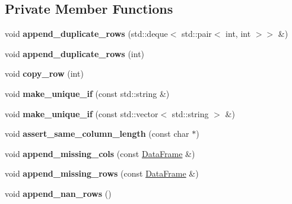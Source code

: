 \subsection*{Private Member Functions}
\begin{DoxyCompactItemize}
\item 
\mbox{\label{classDataFrame_a7c3a5ee79678ae22cdfaf51d6a02e536}} 
void {\bfseries append\+\_\+duplicate\+\_\+rows} (std\+::deque$<$ std\+::pair$<$ int, int $>$$>$ \&)
\item 
\mbox{\label{classDataFrame_aee52488afb8455d8b49786a3b8629249}} 
void {\bfseries append\+\_\+duplicate\+\_\+rows} (int)
\item 
\mbox{\label{classDataFrame_ad44e1c50bc67dc453a02bbcdf7b13a98}} 
void {\bfseries copy\+\_\+row} (int)
\item 
\mbox{\label{classDataFrame_a8454f81fa6854f280c48672214224160}} 
void {\bfseries make\+\_\+unique\+\_\+if} (const std\+::string \&)
\item 
\mbox{\label{classDataFrame_a2bb66e58b8b8153d4ae7c5e640f0fab4}} 
void {\bfseries make\+\_\+unique\+\_\+if} (const std\+::vector$<$ std\+::string $>$ \&)
\item 
\mbox{\label{classDataFrame_ae996ebef2abb39f125adc2cdff8846aa}} 
void {\bfseries assert\+\_\+same\+\_\+column\+\_\+length} (const char $\ast$)
\item 
\mbox{\label{classDataFrame_a56acb2da2d421ca0d28324a069593e23}} 
void {\bfseries append\+\_\+missing\+\_\+cols} (const \hyperlink{classDataFrame}{Data\+Frame} \&)
\item 
\mbox{\label{classDataFrame_a5e5818b6152d279647995f528fbb5ca0}} 
void {\bfseries append\+\_\+missing\+\_\+rows} (const \hyperlink{classDataFrame}{Data\+Frame} \&)
\item 
\mbox{\label{classDataFrame_a8f22d43916f61216b13a36843941d1a6}} 
void {\bfseries append\+\_\+nan\+\_\+rows} ()
\item 
\mbox{\label{classDataFrame_ac96e8f862aa623c8ab1cf057567908f7}} 
$$
\end{DoxyCompactItemize}
